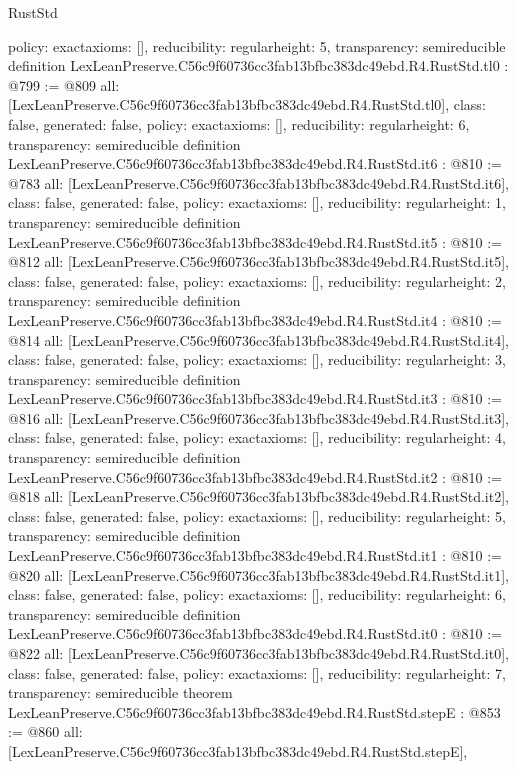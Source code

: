 \begin{lexlean}{RustStd}
\begin{coremodule}
{  policy: exact{axioms: []},
  reducibility: regular{height: 5},
  transparency: semireducible
}
definition LexLeanPreserve.C56c9f60736cc3fab13bfbc383dc49ebd.R4.RustStd.tl0 : @799 := @809 {
  all: [LexLeanPreserve.C56c9f60736cc3fab13bfbc383dc49ebd.R4.RustStd.tl0],
  class: false,
  generated: false,
  policy: exact{axioms: []},
  reducibility: regular{height: 6},
  transparency: semireducible
}
definition LexLeanPreserve.C56c9f60736cc3fab13bfbc383dc49ebd.R4.RustStd.it6 : @810 := @783 {
  all: [LexLeanPreserve.C56c9f60736cc3fab13bfbc383dc49ebd.R4.RustStd.it6],
  class: false,
  generated: false,
  policy: exact{axioms: []},
  reducibility: regular{height: 1},
  transparency: semireducible
}
definition LexLeanPreserve.C56c9f60736cc3fab13bfbc383dc49ebd.R4.RustStd.it5 : @810 := @812 {
  all: [LexLeanPreserve.C56c9f60736cc3fab13bfbc383dc49ebd.R4.RustStd.it5],
  class: false,
  generated: false,
  policy: exact{axioms: []},
  reducibility: regular{height: 2},
  transparency: semireducible
}
definition LexLeanPreserve.C56c9f60736cc3fab13bfbc383dc49ebd.R4.RustStd.it4 : @810 := @814 {
  all: [LexLeanPreserve.C56c9f60736cc3fab13bfbc383dc49ebd.R4.RustStd.it4],
  class: false,
  generated: false,
  policy: exact{axioms: []},
  reducibility: regular{height: 3},
  transparency: semireducible
}
definition LexLeanPreserve.C56c9f60736cc3fab13bfbc383dc49ebd.R4.RustStd.it3 : @810 := @816 {
  all: [LexLeanPreserve.C56c9f60736cc3fab13bfbc383dc49ebd.R4.RustStd.it3],
  class: false,
  generated: false,
  policy: exact{axioms: []},
  reducibility: regular{height: 4},
  transparency: semireducible
}
definition LexLeanPreserve.C56c9f60736cc3fab13bfbc383dc49ebd.R4.RustStd.it2 : @810 := @818 {
  all: [LexLeanPreserve.C56c9f60736cc3fab13bfbc383dc49ebd.R4.RustStd.it2],
  class: false,
  generated: false,
  policy: exact{axioms: []},
  reducibility: regular{height: 5},
  transparency: semireducible
}
definition LexLeanPreserve.C56c9f60736cc3fab13bfbc383dc49ebd.R4.RustStd.it1 : @810 := @820 {
  all: [LexLeanPreserve.C56c9f60736cc3fab13bfbc383dc49ebd.R4.RustStd.it1],
  class: false,
  generated: false,
  policy: exact{axioms: []},
  reducibility: regular{height: 6},
  transparency: semireducible
}
definition LexLeanPreserve.C56c9f60736cc3fab13bfbc383dc49ebd.R4.RustStd.it0 : @810 := @822 {
  all: [LexLeanPreserve.C56c9f60736cc3fab13bfbc383dc49ebd.R4.RustStd.it0],
  class: false,
  generated: false,
  policy: exact{axioms: []},
  reducibility: regular{height: 7},
  transparency: semireducible
}
theorem LexLeanPreserve.C56c9f60736cc3fab13bfbc383dc49ebd.R4.RustStd.stepE : @853 := @860 {
  all: [LexLeanPreserve.C56c9f60736cc3fab13bfbc383dc49ebd.R4.RustStd.stepE],
}
\end{coremodule}
\end{lexlean}
